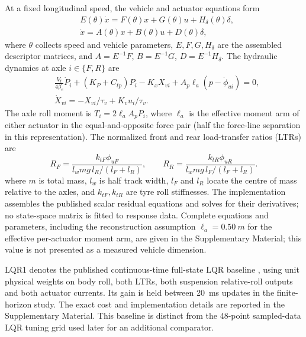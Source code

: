 \documentclass[fleqn,final,5p,times]{elsarticle}
\begin{document}
At a fixed longitudinal speed, the vehicle and actuator equations form
\begin{equation}
\begin{alignedat}{1}
&E(\theta)\dot x=F(\theta)x+G(\theta)u+H_\delta(\theta)\delta,
\\[1em]
&\dot x=A(\theta)x+B(\theta)u+D(\theta)\delta,
\end{alignedat}
\label{eq:ss}
\end{equation}
where $\theta$ collects speed and vehicle parameters, $E,F,G,H_\delta$ are the assembled descriptor matrices, and $A=E^{-1}F$, $B=E^{-1}G$, $D=E^{-1}H_\delta$. The hydraulic dynamics at axle $i\in\{F,R\}$ are
{\small
\begin{equation}
\begin{alignedat}{1}
&\frac{V_t}{4\beta_e}\dot P_i+(K_P+C_{tp})P_i-K_xX_{vi}+A_p\ell_a(p-\dot\phi_{ui})=0,\\
&\dot X_{vi}=-X_{vi}/\tau_v+K_vu_i/\tau_v.
\end{alignedat}
\label{eq:hydraulic}
\end{equation}
}
The axle roll moment is $T_i=2\ell_aA_pP_i$, where $\ell_a$ is the effective moment arm of either actuator in the equal-and-opposite force pair (half the force-line separation in this representation). The normalized front and rear load-transfer ratios (LTRs) are
\begin{equation}
R_F=\frac{k_{tF}\phi_{uF}}{l_wmg\,l_R/(l_F+l_R)},\qquad
R_R=\frac{k_{tR}\phi_{uR}}{l_wmg\,l_F/(l_F+l_R)}.
\label{eq:ltr}
\end{equation}
where $m$ is total mass, $l_w$ is half track width, $l_F$ and $l_R$ locate the centre of mass relative to the axles, and $k_{tF},k_{tR}$ are tyre roll stiffnesses. The implementation assembles the published scalar residual equations and solves for their derivatives; no state-space matrix is fitted to response data. Complete equations and parameters, including the reconstruction assumption $\ell_a=\SI{0.50}{m}$ for the effective per-actuator moment arm, are given in the Supplementary Material; this value is not presented as a measured vehicle dimension.

LQR1 denotes the published continuous-time full-state LQR baseline \cite{vu2017}, using unit physical weights on body roll, both LTRs, both suspension relative-roll outputs and both actuator currents. Its gain is held between \SI{20}{ms} updates in the finite-horizon study. The exact cost and implementation details are reported in the Supplementary Material. This baseline is distinct from the 48-point sampled-data LQR tuning grid used later for an additional comparator.
\end{document}

